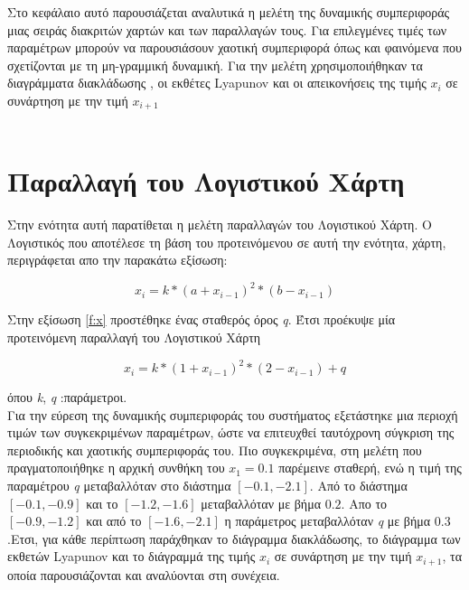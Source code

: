 Στο κεφάλαιο αυτό παρουσιάζεται αναλυτικά η μελέτη της δυναμικής συμπεριφοράς μιας σειράς διακριτών χαρτών και των παραλλαγών τους. Για επιλεγμένες τιμές των παραμέτρων μπορούν να παρουσιάσουν χαοτική συμπεριφορά όπως και φαινόμενα που σχετίζονται με τη μη-γραμμική δυναμική. Για την μελέτη χρησιμοποιήθηκαν τα διαγράμματα διακλάδωσης , οι εκθέτες Lyapunov και οι απεικονήσεις της τιμής \(x_i\) σε συνάρτηση με  την τιμή \(x_{i+1}\)\\\\

\section{Παραλλαγή του Λογιστικού Χάρτη}

Στην ενότητα αυτή παρατίθεται η μελέτη παραλλαγών του Λογιστικού Χάρτη. Ο Λογιστικός που αποτέλεσε τη βάση του προτεινόμενου σε αυτή την ενότητα, χάρτη, περιγράφεται απο την παρακάτω εξίσωση:

\begin{equation}
	x_i=k*(a+x_{i-1})^2 *(b-x_{i-1})
	\label{f:x}
\end{equation}


Στην εξίσωση \ref{f:x} προστέθηκε ένας σταθερός όρος \emph{q}. Έτσι προέκυψε μία προτεινόμενη παραλλαγή του Λογιστικού Χάρτη

	\begin{equation}
		x_i=k*(1+x_{i-1})^2 *(2-x_{i-1}) +q
		\label{f:x1}
	\end{equation}


	όπου \emph{k}, \emph{q} :παράμετροι.\\
	
Για την εύρεση της δυναμικής συμπεριφοράς του συστήματος εξετάστηκε μια περιοχή τιμών των συγκεκριμένων παραμέτρων, ώστε να επιτευχθεί ταυτόχρονη σύγκριση της περιοδικής και χαοτικής συμπεριφοράς του. Πιο συγκεκριμένα, στη μελέτη που πραγματοποιήθηκε η αρχική συνθήκη του $x_1 =0.1$ παρέμεινε  σταθερή, ενώ η τιμή της παραμέτρου \emph{q} μεταβαλλόταν στο διάστημα $[-0.1,-2.1]$. Από το διάστημα  $[-0.1,-0.9]$ και το $[-1.2,-1.6]$ μεταβαλλόταν με βήμα $0.2$. Απο το $[-0.9,-1.2]$ και από το $[-1.6,-2.1]$ η παράμετρος  μεταβαλλόταν \emph{q} με βήμα $0.3$.Ετσι, για κάθε περίπτωση παράχθηκαν το διάγραμμα διακλάδωσης, το διάγραμμα των εκθετών Lyapunov και το διάγραμμά της τιμής \(x_i\) σε συνάρτηση με  την τιμή \(x_{i+1}\), τα οποία παρουσιάζονται και αναλύονται στη συνέχεια.
	
\clearpage


